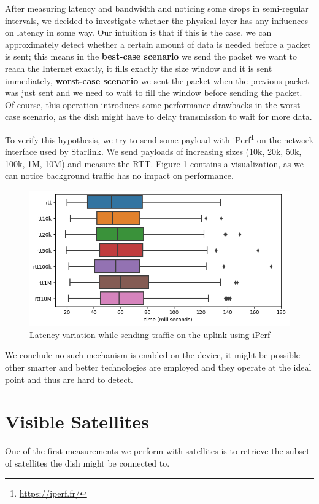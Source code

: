 \documentclass[]{report}
\begin{document}
After measuring latency and bandwidth and noticing some drops in semi-regular intervals, we decided to investigate
whether the physical layer has any influences on latency in some way. Our intuition is that if this is the case, we can
approximately detect whether a certain amount of data is needed before a packet is sent; this means in the \textbf{best-case
scenario} we send the packet we want to reach the Internet exactly, it fills exactly the size window and it is sent
immediately, \textbf{worst-case scenario} we sent the packet when the previous packet was just sent and we need to wait to fill
the window before sending the packet. Of course, this operation introduces some performance drawbacks in the worst-case
scenario, as the dish might have to delay transmission to wait for more data.

To verify this hypothesis, we try to send some payload with iPerf\footnote{\url{https://iperf.fr/}} on the network
interface used by Starlink. We send payloads of increasing sizes (10k, 20k, 50k, 100k, 1M, 10M) and measure the RTT. 
Figure \ref{fig:rtt-iperf} contains a visualization, as we can notice background traffic has no impact on performance.
\begin{figure}
    \label{fig:rtt-iperf}
    \centering
    \includegraphics[width=0.6\columnwidth]{img/latency_iperf.png}
    \caption{Latency variation while sending traffic on the uplink using iPerf}
\end{figure}

We conclude no such mechanism is enabled on the device, it might be possible other smarter and better technologies are
employed and they operate at the ideal point and thus are hard to detect.

\section{Visible Satellites}

One of the first measurements we perform with satellites is to retrieve the subset of satellites the dish might be
connected to.
\end{document}
